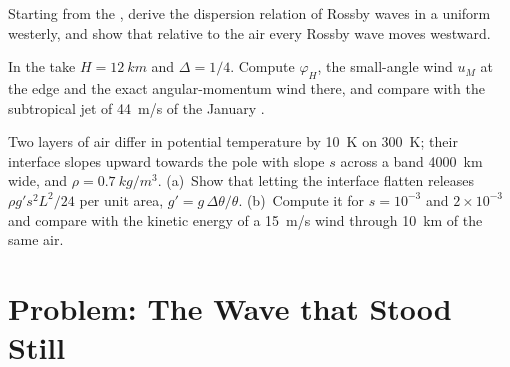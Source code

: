 \begin{exercise}[$\star\star\star$]\label{exo:b3:atmospheric-dynamics:10}
Starting from the , derive the dispersion
relation of Rossby waves in a uniform westerly, and show that relative to
the air every Rossby wave moves westward.
\end{exercise}

\begin{exercise}[$\star\star\star$]\label{exo:b3:atmospheric-dynamics:11}
In the  take $H = \qty{12}{km}$ and $\Delta = 1/4$. Compute
$\varphi_H$, the small-angle wind $u_M$ at the edge and the exact
angular-momentum wind there, and compare with the subtropical jet of
\qty{44}{m/s} of the January .
\end{exercise}

\begin{exercise}[$\star\star\star$]\label{exo:b3:atmospheric-dynamics:12}
Two layers of air differ in potential temperature by \qty{10}{K} on
\qty{300}{K}; their interface slopes upward towards the pole with slope $s$
across a band \qty{4000}{km} wide, and $\rho = \qty{0.7}{kg/m^3}$. (a)~Show
that letting the interface flatten releases $\rho g' s^2L^2/24$ per unit
area, $g' = g\,\Delta\theta/\theta$. (b)~Compute it for $s = 10^{-3}$ and
$2\times10^{-3}$ and compare with the kinetic energy of a \qty{15}{m/s}
wind through \qty{10}{km} of the same air.
\end{exercise}

\section{Problem: The Wave that Stood Still}


